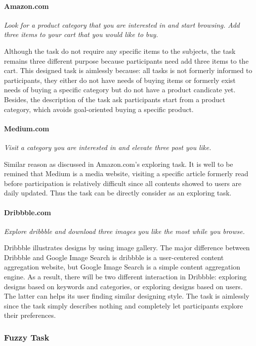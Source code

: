 \paragraph{Amazon.com} \emph{Look for a product category that you are interested in and start browsing. 
        Add three items to your cart that you would like to buy.}

Although the task do not require any specific items to the subjects, the task remains three different
purpose because participants need add three items to the cart. This designed task 
is aimlessly because: all tasks is not formerly informed to participants, 
they either do not have needs of buying items or 
formerly exist needs of buying a specific category but do not have a product candicate yet.
Besides, the description of the task ask participants start from a product category, which avoids 
goal-oriented buying a specific product.

\paragraph{Medium.com} \emph{Visit a category you are interested in and elevate three post you like.}

Similar reason as discussed in Amazon.com's exploring task. It is well to be remined that Medium is a media
website, visiting a specific article formerly read before participation is relatively difficult 
since all contents showed to users are daily updated. Thus the task can be directly consider as an exploring task.

\paragraph{Dribbble.com} \emph{Explore dribbble and download three images you like the most while you browse.}

Dribbble illustrates designs by using image gallery. The major difference between Dribbble and Google Image Search
is dribbble is a user-centered content aggregation website, but Google Image Search is a simple content aggregation engine.
As a result, there will be two different interaction in Dribbble: exploring designs based on keywords and categories,
or exploring designs based on users. The latter can helps its user finding similar designing style.
The task is aimlessly since the task simply describes nothing and completely let participants explore their preferences.

\subsubsection{Fuzzy Task}

